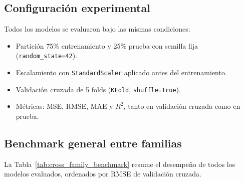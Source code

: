 \documentclass[12pt,letterpaper]{article}
\begin{document}
\subsection{Configuración experimental}

Todos los modelos se evaluaron bajo las mismas condiciones:
\begin{itemize}
    \item Partición 75\% entrenamiento y 25\% prueba con semilla fija (\texttt{random\_state=42}).
    \item Escalamiento con \texttt{StandardScaler} aplicado antes del entrenamiento.
    \item Validación cruzada de 5 folds (\texttt{KFold}, \texttt{shuffle=True}).
    \item Métricas: MSE, RMSE, MAE y $R^2$, tanto en validación cruzada como en prueba.
\end{itemize}

\subsection{Benchmark general entre familias}

La Tabla~\ref{tab:cross_family_benchmark} resume el desempeño de todos los modelos evaluados, ordenados por RMSE de validación cruzada.
\end{document}
